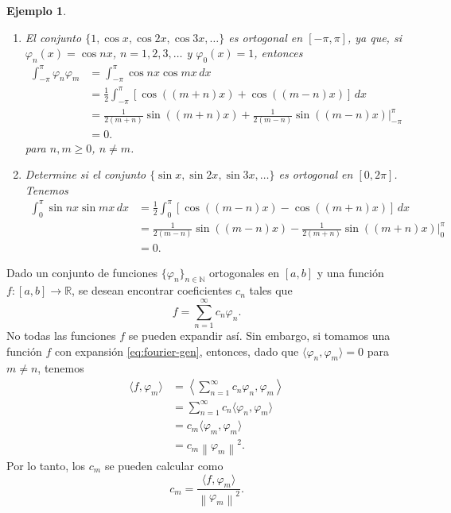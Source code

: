 \documentclass[11pt,letterpaper,draft]{report}
\newtheorem{example}[defn]{Ejemplo}
\newcommand\R{\mathbb R}
\newcommand\N{\mathbb N}
\newcommand\norm[1]{\left\|#1\right\|}
\newcommand\<{\langle}
\renewcommand\>{\rangle}
\renewcommand\phi\varphi
\begin{document}
\begin{example}
  \begin{enumerate}
    \item   
    El conjunto $\{1,\cos x,\cos 2x,\cos 3x,\dots\}$ es ortogonal
    en $[-\pi,\pi]$, ya que, si $\phi_n(x)=\cos nx$,
    $n=1,2,3,\dots$ y $\phi_0(x)=1$, entonces
    \begin{align*}
      \int_{-\pi}^\pi \phi_n\phi_m
      &= \int_{-\pi}^\pi \cos nx \cos mx \,dx \\
      &= \frac{1}{2}
        \int_{-\pi}^\pi [\cos((m+n)x) + \cos((m-n)x)] \,dx \\
      &= \frac{1}{2(m+n)}\sin((m+n)x) + \frac{1}{2(m-n)}\sin((m-n)x)
      |_{-\pi}^\pi \\
      &= 0.
    \end{align*}
    para $n,m\geq 0$, $n\neq m$.

    \item Determine si el conjunto $\{\sin x,\sin 2x,\sin
    3x,\dots\}$ es ortogonal en $[0,2\pi]$.
    Tenemos
    \begin{align*}
      \int_0^\pi \sin nx\sin mx \,dx
      &= \frac{1}{2}\int_0^\pi[\cos((m-n)x)-\cos((m+n)x)] \,dx \\
      &= \frac{1}{2(m-n)}\sin((m-n)x)
        - \frac{1}{2(m+n)}\sin((m+n)x) |_0^\pi \\
      &= 0.
    \end{align*}
  \end{enumerate}
\end{example}

Dado un conjunto de funciones $\{\phi_n\}_{n\in\N}$ ortogonales en
$[a,b]$ y una función $f:[a,b]\to\R$,
se desean encontrar coeficientes $c_n$ tales que
\begin{equation}\label{eq:fourier-gen}
  f = \sum_{n=1}^{\infty}c_n\phi_n.
\end{equation}
No todas las funciones $f$ se pueden expandir así.
Sin embargo, si tomamos una función $f$ con expansión
\eqref{eq:fourier-gen}, entonces,
dado que $\<\phi_n,\phi_m\>=0$ para $m\neq n$, tenemos
\begin{align*}
  \<f,\phi_m\>
  &= \left\< \sum_{n=1}^{\infty}c_n\phi_n,\phi_m\right\> \\
  &= \sum_{n=1}^{\infty}c_n\<\phi_n,\phi_m\> \\
  &= c_m\<\phi_m,\phi_m\> \\
  &= c_m\norm{\phi_m}^{2}.
\end{align*}
Por lo tanto, los $c_m$ se pueden calcular como
\[
  c_m = \frac{\<f,\phi_m\>}{\norm{\phi_m}^2}
.\]
\end{document}
